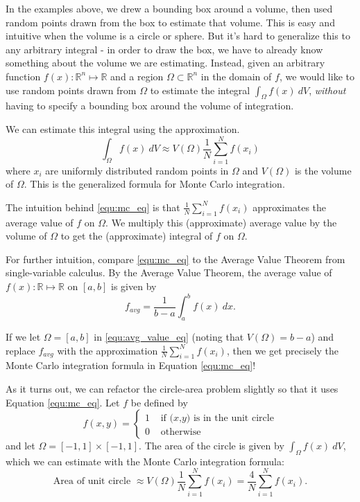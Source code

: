 In the examples above, we drew a bounding box around a volume, then used random points drawn from the box to estimate that volume.
This is easy and intuitive when the volume is a circle or sphere.
But it's hard to generalize this to any arbitrary integral - in order to draw the box, we have to already know something about the volume we are estimating.
Instead, given an arbitrary function $f(x) : \mathbb{R}^n \mapsto \mathbb{R} $ and a region $\Omega \subset \mathbb{R}^n$ in the domain of $f$, we would like to use random points drawn from $\Omega$ to estimate the integral
$\int_\Omega f(x)\:dV$,
\textit{without} having to specify a bounding box around the volume of integration.

We can estimate this integral using the approximation.
\begin{equation}\label{equ:mc_eq}
\int_\Omega f(x)\:dV \approx V(\Omega) \frac{1}{N} \sum_{i=1}^N f(x_i)
\end{equation}
where $x_i$ are uniformly distributed random points in $\Omega$ and $V(\Omega)$ is the volume of $\Omega$.
This is the generalized formula for Monte Carlo integration.

The intuition behind \eqref{equ:mc_eq} is that $\frac{1}{N} \sum_{i=1}^N f(x_i)$ approximates the average value of $f$ on $\Omega$.
We multiply this (approximate) average value by the volume of $\Omega$ to get the (approximate) integral of $f$ on $\Omega$.

For further intuition, compare \eqref{equ:mc_eq} to the Average Value Theorem from single-variable calculus.
By the Average Value Theorem, the average value of $f(x) : \mathbb{R} \mapsto \mathbb{R} $ on ${[a,b]}$ is given by
\begin{equation}\label{equ:avg_value_eq}
f_{avg} = \frac{1}{b-a}\int_a^b f(x)\:dx.
\end{equation}

If we let $\Omega = {[a,b]}$ in \eqref{equ:avg_value_eq} (noting that $V(\Omega) = b - a$) and replace $f_{avg}$ with the approximation $\frac{1}{N} \sum_{i=1}^N f(x_i)$, then we get precisely the Monte Carlo integration formula in Equation \eqref{equ:mc_eq}!

As it turns out, we can refactor the circle-area problem slightly so that it uses Equation \eqref{equ:mc_eq}.
Let $f$ be defined by
$$f(x,y) = \begin{cases} 1 &\mbox{ if $(x$,$y)$ is in the unit circle} \\ 0 &\mbox{ otherwise} \end{cases}$$
and let $\Omega =   {[-1,1]} \times {[-1,1]}$.
The area of the circle is given by
$\int_\Omega f(x)\:dV$,
which we can estimate with the Monte Carlo integration formula:
\[
\mbox{Area of unit circle } \approx V(\Omega) \frac{1}{N} \sum_{i=1}^N f(x_i) = \frac{4}{N} \sum_{i=1}^N f(x_i).
\]

